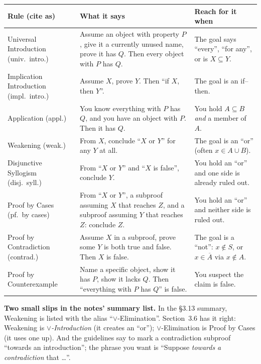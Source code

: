 \begin{longtable}{@{}>{\raggedright\arraybackslash}p{3.3cm}>{\raggedright\arraybackslash}p{6.5cm}>{\raggedright\arraybackslash}p{5.8cm}@{}}
\toprule
\textbf{Rule (cite as)} & \textbf{What it says} & \textbf{Reach for it when}\\
\midrule
\endhead
Universal Introduction (univ.\ intro.) & Assume an object with property $P$, give it a currently unused name, prove it has $Q$. Then every object with $P$ has $Q$. & The goal says ``every'', ``for any'', or is $X\subseteq Y$.\\
\addlinespace
Implication Introduction (impl.\ intro.) & Assume $X$, prove $Y$. Then ``if $X$, then $Y$''. & The goal is an if--then.\\
\addlinespace
Application (appl.) & You know everything with $P$ has $Q$, and you have an object with $P$. Then it has $Q$. & You hold $A\subseteq B$ \emph{and} a member of $A$.\\
\addlinespace
Weakening (weak.) & From $X$, conclude ``$X$ or $Y$'' for any $Y$ at all. & The goal is an ``or'' (often $x\in A\cup B$).\\
\addlinespace
Disjunctive Syllogism (disj.\ syll.) & From ``$X$ or $Y$'' and ``$X$ is false'', conclude $Y$. & You hold an ``or'' and one side is already ruled out.\\
\addlinespace
Proof by Cases (pf.\ by cases) & From ``$X$ or $Y$'', a subproof assuming $X$ that reaches $Z$, and a subproof assuming $Y$ that reaches $Z$: conclude $Z$. & You hold an ``or'' and neither side is ruled out.\\
\addlinespace
Proof by Contradiction (contrad.) & Assume $X$ in a subproof, prove some $Y$ is both true and false. Then $X$ is false. & The goal is a ``not'': $x\notin S$, or $x\in\overline{A}$ via $x\notin A$.\\
\midrule
Proof by Counterexample & Name a specific object, show it has $P$, show it lacks $Q$. Then ``everything with $P$ has $Q$'' is false. & You suspect the claim is false.\\
\bottomrule
\end{longtable}

\begin{notebox}
\textbf{Two small slips in the notes' summary list.} In the \S3.13 summary, Weakening is listed with the alias ``$\vee$-Elimination''. Section~3.6 has it right: Weakening is \emph{$\vee$-Introduction} (it creates an ``or''); $\vee$-Elimination is Proof by Cases (it uses one up). And the guidelines say to mark a contradiction subproof ``towards an introduction''; the phrase you want is ``Suppose \emph{towards a contradiction} that \dots''.
\end{notebox}

